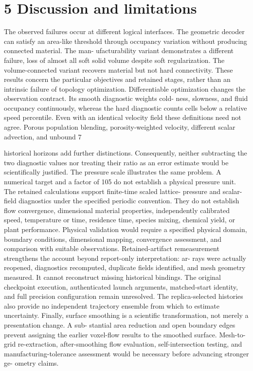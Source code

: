 \documentclass[11pt]{article}
\begin{document}
\section*{5 Discussion and limitations}

The observed failures occur at different logical interfaces. The geometric decoder can satisfy an
area-like threshold through occupancy variation without producing connected material. The man-
ufacturability variant demonstrates a different failure, loss of almost all soft solid volume despite
soft regularization. The volume-connected variant recovers material but not hard connectivity.
These results concern the particular objectives and retained stages, rather than an intrinsic failure
of topology optimization.
Differentiable optimization changes the observation contract. Its smooth diagnostic weights cold-
ness, slowness, and fluid occupancy continuously, whereas the hard diagnostic counts cells below
a relative speed percentile. Even with an identical velocity field these definitions need not agree.
Porous population blending, porosity-weighted velocity, different scalar advection, and unbound
7

historical horizons add further distinctions. Consequently, neither subtracting the two diagnostic
values nor treating their ratio as an error estimate would be scientifically justified.
The pressure scale illustrates the same problem. A numerical target and a factor of 105 do
not establish a physical pressure unit. The retained calculations support finite-time scaled lattice-
pressure and scalar-field diagnostics under the specified periodic convention. They do not establish
flow convergence, dimensional material properties, independently calibrated speed, temperature
or time, residence time, species mixing, chemical yield, or plant performance. Physical validation
would require a specified physical domain, boundary conditions, dimensional mapping, convergence
assessment, and comparison with suitable observations.
Retained-artifact remeasurement strengthens the account beyond report-only interpretation: ar-
rays were actually reopened, diagnostics recomputed, duplicate fields identified, and mesh geometry
measured. It cannot reconstruct missing historical bindings. The original checkpoint execution,
authenticated launch arguments, matched-start identity, and full precision configuration remain
unresolved. The replica-selected histories also provide no independent trajectory ensemble from
which to estimate uncertainty.
Finally, surface smoothing is a scientific transformation, not merely a presentation change. A sub-
stantial area reduction and open boundary edges prevent assigning the earlier voxel-flow results to
the smoothed surface. Mesh-to-grid re-extraction, after-smoothing flow evaluation, self-intersection
testing, and manufacturing-tolerance assessment would be necessary before advancing stronger ge-
ometry claims.
\end{document}

